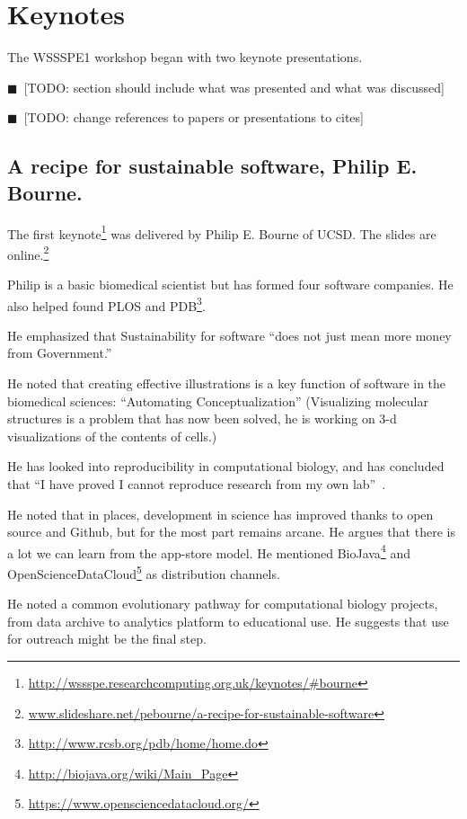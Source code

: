 \documentclass[11pt, oneside]{amsart}
\newcommand{\todo}[1]{{\color{blue}$\blacksquare$~\textsf{[TODO: #1]}}}
\begin{document}
\section{Keynotes} \label{sec:keynotes}

The WSSSPE1 workshop began with two keynote presentations.

\todo{section should include what was presented and what was discussed}

\todo{change references to papers or presentations to cites}

\subsection{A recipe for sustainable software, Philip E. Bourne.}

The first
keynote\footnote{\url{http://wssspe.researchcomputing.org.uk/keynotes/\#bourne}}
was delivered by Philip E. Bourne of UCSD. The slides are
online.\footnote{\url{www.slideshare.net/pebourne/a-recipe-for-sustainable-software}}

Philip is a basic biomedical scientist but has formed four software
companies. He also helped found PLOS and
PDB\footnote{\url{http://www.rcsb.org/pdb/home/home.do}}.

He emphasized that Sustainability for software ``does not just mean
more money from Government.''

He noted that creating effective illustrations is a key function of
software in the biomedical sciences: ``Automating Conceptualization''
(Visualizing molecular structures is a problem that has now been
solved, he is working on 3-d visualizations of the contents of cells.)

He has looked into reproducibility in computational biology, and has
concluded that ``I have proved I cannot reproduce research from my own
lab''~\cite{Veretnik}.

He noted that in places, development in science has improved thanks to
open source and Github, but for the most part remains arcane. He
argues that there is a lot we can learn from the app-store model. He
mentioned BioJava\footnote{\url{http://biojava.org/wiki/Main_Page}}
and
OpenScienceDataCloud\footnote{\url{https://www.opensciencedatacloud.org/}}
as distribution channels.

He noted a common evolutionary pathway for computational biology
projects, from data archive to analytics platform to educational
use. He suggests that use for outreach might be the final step.
\end{document}
